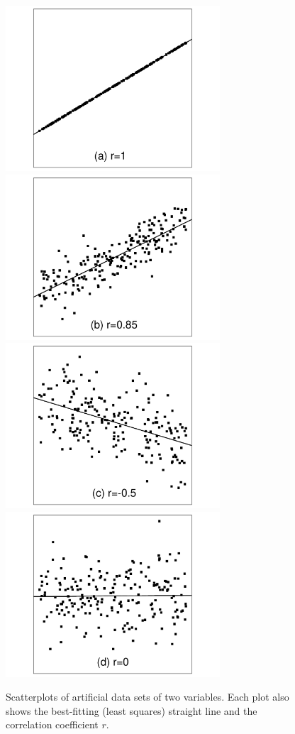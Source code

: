 \begin{figure}
\caption{
Scatterplots of artificial data sets of two variables. Each plot
also shows the best-fitting (least squares) straight line and the
correlation coefficient $r$.
}
\label{f_scatterplots}
\begin{center}
\hspace*{-2.5em}
\includegraphics[width=8cm]{olspl1}\hspace*{-5em}
\includegraphics[width=8cm]{olspl2}\\
\hspace*{-2.5em}
\includegraphics[width=8cm]{olspl3}\hspace*{-5em}
\includegraphics[width=8cm]{olspl4}\\

\end{center}
\end{figure}
